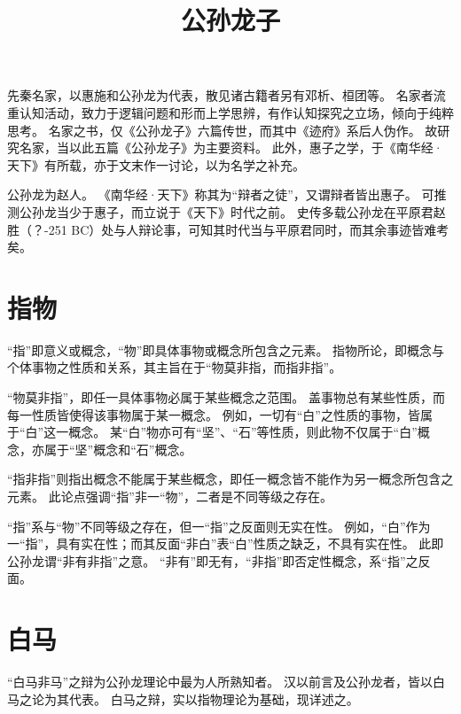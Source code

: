 \documentclass[11pt]{article}
\title{公孙龙子}
\date{}
\begin{document}
  \maketitle
  
  \linenumbers

先秦名家，以惠施和公孙龙为代表，散见诸古籍者另有邓析、桓团等。
名家者流重认知活动，致力于逻辑问题和形而上学思辨，有作认知探究之立场，倾向于纯粹思考。
名家之书，仅《公孙龙子》六篇传世，而其中《迹府》系后人伪作。
故研究名家，当以此五篇《公孙龙子》为主要资料。
此外，惠子之学，于《南华经·天下》有所载，亦于文末作一讨论，以为名学之补充。

\newline
公孙龙为赵人。
《南华经·天下》称其为“辩者之徒”，又谓辩者皆出惠子。
可推测公孙龙当少于惠子，而立说于《天下》时代之前。
史传多载公孙龙在平原君赵胜（？-251 BC）处与人辩论事，可知其时代当与平原君同时，而其余事迹皆难考矣。

\section{指物}
“指”即意义或概念，“物”即具体事物或概念所包含之元素。
指物所论，即概念与个体事物之性质和关系，其主旨在于“物莫非指，而指非指”。

\newline

“物莫非指”，即任一具体事物必属于某些概念之范围。
盖事物总有某些性质，而每一性质皆使得该事物属于某一概念。
例如，一切有“白”之性质的事物，皆属于“白”这一概念。
某“白”物亦可有“坚”、“石”等性质，则此物不仅属于“白”概念，亦属于“坚”概念和“石”概念。

\newline

“指非指”则指出概念不能属于某些概念，即任一概念皆不能作为另一概念所包含之元素。
此论点强调“指”非一“物”，二者是不同等级之存在。

\newline

“指”系与“物”不同等级之存在，但一“指”之反面则无实在性。
例如，“白”作为一“指”，具有实在性；而其反面“非白”表“白”性质之缺乏，不具有实在性。
此即公孙龙谓“非有非指”之意。
“非有”即无有，“非指”即否定性概念，系“指”之反面。

\section{白马}
“白马非马”之辩为公孙龙理论中最为人所熟知者。
汉以前言及公孙龙者，皆以白马之论为其代表。
白马之辩，实以指物理论为基础，现详述之。
\end{document}
